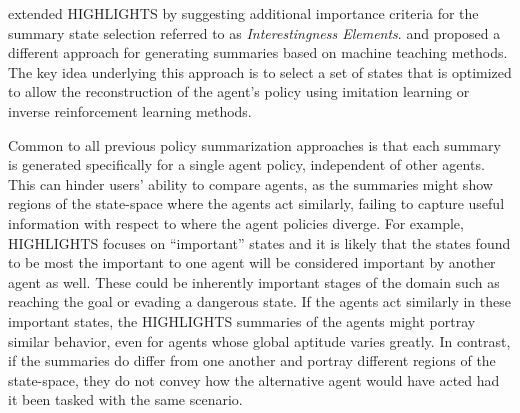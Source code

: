 \citet{Sequeira2020} extended HIGHLIGHTS by suggesting additional importance
criteria for the summary state selection referred to as \emph{Interestingness
Elements}. \citet{huang2017enabling} and \citet{lage2019exploring} proposed a different
approach for generating summaries based on machine teaching methods. The key idea underlying this approach is to select a set of states that is optimized to allow
the reconstruction of the agent's policy using imitation learning or inverse
reinforcement learning methods.


Common to all previous policy summarization approaches is that each summary is
generated specifically for a single agent policy, independent of other agents.
This can hinder users' ability to compare agents, as the
summaries might show regions of the state-space where the agents act similarly,
failing to capture useful information with respect to where the agent policies
diverge. For example, HIGHLIGHTS focuses on ``important'' states and it is
likely that the states found to be most the important to one agent will be
considered important by another agent as well. These could be inherently
important stages of the domain such as reaching the goal or evading a dangerous
state. If the agents act similarly in these important states, the HIGHLIGHTS
summaries of the agents might portray similar behavior, even for agents whose
global aptitude varies greatly. In contrast, if the summaries do differ from
one another and portray different regions of the state-space, they do not convey how
the alternative agent would have acted had it been tasked with the same
scenario.

